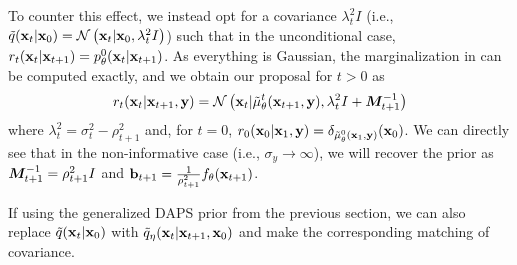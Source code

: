\documentclass{proc}
\begin{document}
To counter this effect, we instead opt for a covariance $\lambda_t^2I$ (i.e., $\tilde q(\mathbf{x}_{t}|\mathbf{x}_0) = \mathcal{N}\left(\mathbf{x}_{t}|\mathbf{x}_0, \lambda_t^2I\right)$) such that in the unconditional case, $r_t(\mathbf{x}_{t}|\mathbf{x}_{t+1}) = p_\theta^0(\mathbf{x}_{t}|\mathbf{x}_{t+1})$. As everything is Gaussian, the marginalization in  can be computed exactly, and we obtain our proposal for $t>0$ as
\begin{align}
    r_t(\xt|\xtplusone, \y) 
    = 
    \mathcal{N}\left( \xt|
    \tilde \mu_\theta^t(\xtplusone, \y), \lambda_{t}^2I + \mM_{t+1}^{-1}
    \right)  %
    \label{eq:ddsmc_proposal}
\end{align}
where $\lambda_t^2 = \sigma^2_t - \rho_{t+1}^2$ and, for $t=0$, $r_0(\mathbf{x}_0|\mathbf{x}_1, \mathbf{y}) = \delta_{\tilde \mu_\theta^0(\mathbf{x}_1, \mathbf{y})}(\mathbf{x}_0)$. We can directly see that in the non-informative case (i.e., $\sigma_y \rightarrow \infty$), we will recover the prior as ${\bm{M}}_{t+1}^{-1} = \rho_{t+1}^2I$ and ${\mathbf{b}}_{t+1} = \frac{1}{\rho_{t+1}^2}f_\theta(\mathbf{x}_{t+1})$. 

If using the generalized DAPS prior from the previous section, we can also replace $\tilde q(\mathbf{x}_{t}|\mathbf{x}_0)$ with $\tilde q_\eta(\mathbf{x}_{t}|\mathbf{x}_{t+1}, \mathbf{x}_0)$ and make the corresponding matching of covariance.
\end{document}
